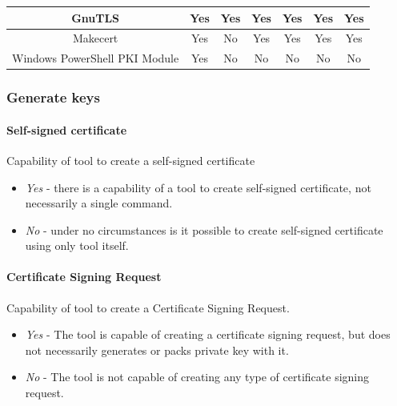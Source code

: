 \documentclass[10pt, a4paper]{report}
\begin{document}
\begin{table}[h!]
\begin{adjustbox}{max width=\textwidth}
\begin{tabular}{|c|c|c|c|c|c|c|}
GnuTLS                        & \cellcolor[HTML]{34FF34}Yes                                          & \cellcolor[HTML]{34FF34}Yes & \cellcolor[HTML]{34FF34}Yes & \cellcolor[HTML]{34FF34}Yes & \cellcolor[HTML]{34FF34}Yes & \cellcolor[HTML]{34FF34}Yes \\ \hline
Makecert                      & \cellcolor[HTML]{34FF34}Yes					     & \cellcolor[HTML]{FE0000}No  & \cellcolor[HTML]{34FF34}Yes & \cellcolor[HTML]{FFC702}Yes & \cellcolor[HTML]{34FF34}Yes & \cellcolor[HTML]{34FF34}Yes \\ \hline
Windows PowerShell PKI Module & \cellcolor[HTML]{34FF34}Yes                                          & \cellcolor[HTML]{FE0000}No  & \cellcolor[HTML]{FE0000}No  & \cellcolor[HTML]{FE0000}No  & \cellcolor[HTML]{FE0000}No  & \cellcolor[HTML]{FE0000}No  \\ \hline
\end{tabular}
\end{adjustbox}
\end{table}

\subsubsection{Generate keys}

\paragraph{Self-signed certificate}
Capability of tool to create a self-signed certificate
\begin{itemize}
 \item \textit{Yes} - there is a capability of a tool to create self-signed certificate, not necessarily a single command.
 \item \textit{No} - under no circumstances is it possible to create self-signed certificate using only tool itself.
\end{itemize}

\paragraph{Certificate Signing Request}
Capability of tool to create a Certificate Signing Request.
\begin{itemize}
 \item \textit{Yes} - The tool is capable of creating a certificate signing request, but does not necessarily generates or packs private key with it.
 \item \textit{No} - The tool is not capable of creating any type of certificate signing request.
\end{itemize}
\end{document}

